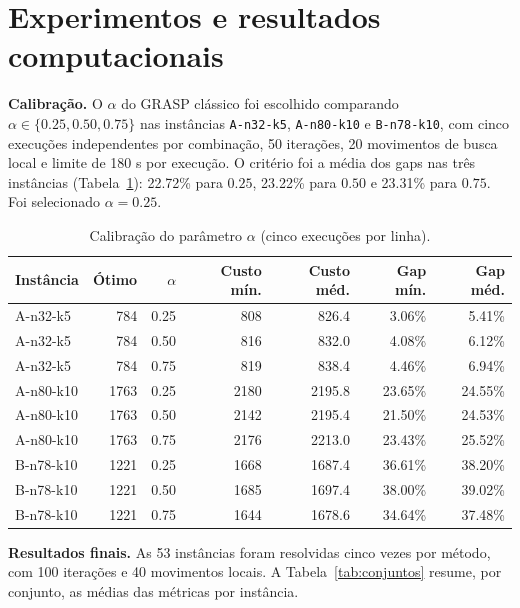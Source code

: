 \section{Experimentos e resultados computacionais}
\label{sec:experimentos}

\textbf{Calibração.} O $\alpha$ do GRASP clássico foi escolhido comparando $\alpha\in\{0.25,0.50,0.75\}$ nas instâncias \texttt{A-n32-k5}, \texttt{A-n80-k10} e \texttt{B-n78-k10}, com cinco execuções independentes por combinação, 50 iterações, 20 movimentos de busca local e limite de 180 s por execução. O critério foi a média dos gaps nas três instâncias (Tabela~\ref{tab:calibracao}): 22.72\% para $0.25$, 23.22\% para $0.50$ e 23.31\% para $0.75$. Foi selecionado $\alpha=0.25$.

\begin{table}[H]
\centering
\caption{Calibração do parâmetro $\alpha$ (cinco execuções por linha).}
\label{tab:calibracao}
\footnotesize
\begin{tabular}{lrrrrrr}
\toprule
Instância & Ótimo & $\alpha$ & Custo mín. & Custo méd. & Gap mín. & Gap méd. \\
\midrule
A-n32-k5 & 784 & 0.25 & 808 & 826.4 & 3.06\% & 5.41\% \\
A-n32-k5 & 784 & 0.50 & 816 & 832.0 & 4.08\% & 6.12\% \\
A-n32-k5 & 784 & 0.75 & 819 & 838.4 & 4.46\% & 6.94\% \\
A-n80-k10 & 1763 & 0.25 & 2180 & 2195.8 & 23.65\% & 24.55\% \\
A-n80-k10 & 1763 & 0.50 & 2142 & 2195.4 & 21.50\% & 24.53\% \\
A-n80-k10 & 1763 & 0.75 & 2176 & 2213.0 & 23.43\% & 25.52\% \\
B-n78-k10 & 1221 & 0.25 & 1668 & 1687.4 & 36.61\% & 38.20\% \\
B-n78-k10 & 1221 & 0.50 & 1685 & 1697.4 & 38.00\% & 39.02\% \\
B-n78-k10 & 1221 & 0.75 & 1644 & 1678.6 & 34.64\% & 37.48\% \\
\bottomrule
\end{tabular}
\end{table}

\textbf{Resultados finais.} As 53 instâncias foram resolvidas cinco vezes por método, com 100 iterações e 40 movimentos locais. A Tabela~\ref{tab:conjuntos} resume, por conjunto, as médias das métricas por instância.

